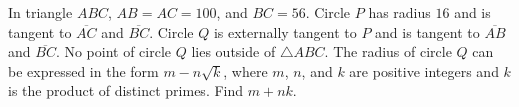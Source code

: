 In triangle $ ABC$, $ AB = AC = 100$, and $ BC = 56$. Circle $ P$ has radius $ 16$ and is tangent to $ \overline{AC}$ and $ \overline{BC}$. Circle $ Q$ is externally tangent to $ P$ and is tangent to $ \overline{AB}$ and $ \overline{BC}$. No point of circle $ Q$ lies outside of $ \triangle ABC$. The radius of circle $ Q$ can be expressed in the form $ m - n\sqrt {k}$, where $ m$, $ n$, and $ k$ are positive integers and $ k$ is the product of distinct primes. Find $ m + nk$.
